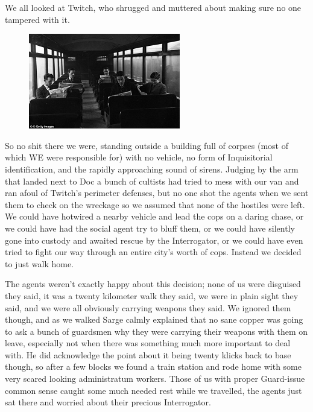 We all looked at Twitch, who shrugged and muttered about making sure no one tampered with it.

\begin{figure}
	\begin{center}
		\includegraphics[width=\figwidth]{pics/5/16.png}
	\end{center}
\end{figure}
So no shit there we were, standing outside a building full of corpses (most of which WE were responsible for) with no vehicle, no form of Inquisitorial identification, and the rapidly approaching sound of sirens. 
Judging by the arm that landed next to Doc a bunch of cultists had tried to mess with our van and ran afoul of Twitch’s perimeter defenses, but no one shot the agents when we sent them to check on the wreckage so we assumed that none of the hostiles were left. 
We could have hotwired a nearby vehicle and lead the cops on a daring chase, or we could have had the social agent try to bluff them, or we could have silently gone into custody and awaited rescue by the Interrogator, or we could have even tried to fight our way through an entire city’s worth of cops. 
Instead we decided to just walk home.

The agents weren’t exactly happy about this decision; 
none of us were disguised they said, it was a twenty kilometer walk they said, we were in plain sight they said, and we were all obviously carrying weapons they said. 
We ignored them though, and as we walked Sarge calmly explained that no sane copper was going to ask a bunch of guardsmen why they were carrying their weapons with them on leave, especially not when there was something much more important to deal with. 
He did acknowledge the point about it being twenty klicks back to base though, so after a few blocks we found a train station and rode home with some very scared looking administratum workers. 
Those of us with proper Guard-issue common sense caught some much needed rest while we travelled, the agents just sat there and worried about their precious Interrogator.

